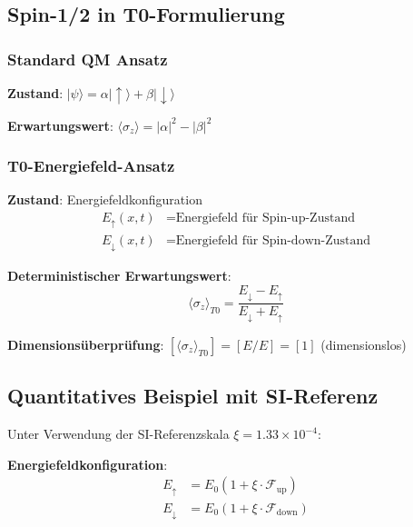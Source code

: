 \documentclass[12pt,a4paper]{article}
\newcommand{\Efield}{E}
\newcommand{\xipar}{\xi}
\begin{document}
	\subsection{Spin-1/2 in T0-Formulierung}
	
	\subsubsection{Standard QM Ansatz}
	
	\textbf{Zustand}: $|\psi\rangle = \alpha|{\uparrow}\rangle + \beta|{\downarrow}\rangle$
	
	\textbf{Erwartungswert}: $\langle \sigma_z \rangle = |\alpha|^2 - |\beta|^2$
	
	\subsubsection{T0-Energiefeld-Ansatz}
	
	\textbf{Zustand}: Energiefeldkonfiguration
	\begin{align}
		\Efield_{\uparrow}(x,t) &= \text{Energiefeld für Spin-up-Zustand} \\
		\Efield_{\downarrow}(x,t) &= \text{Energiefeld für Spin-down-Zustand}
	\end{align}
	
	\textbf{Deterministischer Erwartungswert}:
	\begin{equation}
		\boxed{\langle \sigma_z \rangle_{T0} = \frac{\Efield_{\downarrow} - \Efield_{\uparrow}}{\Efield_{\downarrow} + \Efield_{\uparrow}}}
		\label{eq:deterministic_spin_z}
	\end{equation}
	
	\textbf{Dimensionsüberprüfung}: $[\langle \sigma_z \rangle_{T0}] = [E/E] = [1]$ (dimensionslos) \checkmark
	
	\subsection{Quantitatives Beispiel mit SI-Referenz}
	
	Unter Verwendung der SI-Referenzskala $\xipar = 1.33 \times 10^{-4}$:
	
	\textbf{Energiefeldkonfiguration}:
	\begin{align}
		\Efield_{\uparrow} &= E_0 (1 + \xipar \cdot \mathcal{F}_{\text{up}}) \\
		\Efield_{\downarrow} &= E_0 (1 + \xipar \cdot \mathcal{F}_{\text{down}})
	\end{align}
	
\end{document}
